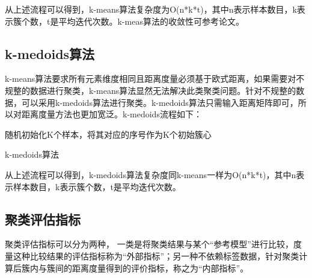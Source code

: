 从上述流程可以得到，k-means算法复杂度为O(n*k*t)，其中n表示样本数目，k表示簇个数，t是平均迭代次数。k-meas算法的收敛性可参考论文\cite{neal1998view}。

\subsection{k-medoids算法}
k-means算法要求所有元素维度相同且距离度量必须基于欧式距离，如果需要对不规整的数据进行聚类，k-means算法显然无法解决此类聚类问题。针对不规整的数据，可以采用k-medoids算法进行聚类。k-medoids算法只需输入距离矩阵即可，所以对距离度量方法也更加宽泛。k-medoids流程如下：\\
\begin{algorithm}[H]
	 随机初始化K个样本，将其对应的序号作为K个初始簇心\;
	 \caption{k-medoids算法}
\end{algorithm}

从上述流程可以得到，k-medoids算法复杂度同k-means一样为O(n*k*t)，其中n表示样本数目，k表示簇个数，t是平均迭代次数。


\subsection{聚类评估指标}
聚类评估指标可以分为两种，
一类是将聚类结果与某个“参考模型”进行比较，度量这种比较结果的评估指标称为“外部指标”；另一种不依赖标签数据，针对聚类计算后簇内与簇间的距离度量得到的评价指标，称之为“内部指标”。

